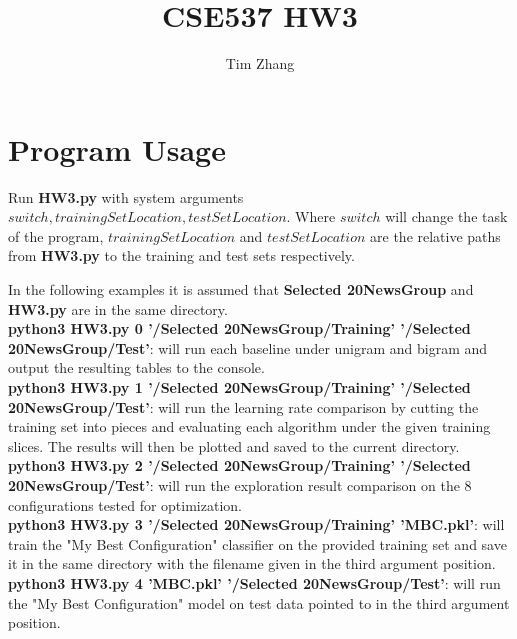 \documentclass[11pt, oneside]{article}   	%
\title{CSE537 HW3}
\author{Tim Zhang}
\begin{document}
\maketitle
\section{Program Usage}
Run \textbf{HW3.py} with system arguments $switch, trainingSetLocation, testSetLocation$.  Where $switch$ will change the task of the program, $trainingSetLocation$ and $testSetLocation$ are the relative paths from \textbf{HW3.py} to the training and test sets respectively.

In the following examples it is assumed that \textbf{Selected 20NewsGroup} and \textbf{HW3.py} are in the same directory.\\

\textbf{python3 HW3.py 0 '/Selected 20NewsGroup/Training' '/Selected 20NewsGroup/Test'}: will run each baseline under unigram and bigram and output the resulting tables to the console.\\

\textbf{python3 HW3.py 1 '/Selected 20NewsGroup/Training' '/Selected 20NewsGroup/Test'}: will run the learning rate comparison by cutting the training set into pieces and evaluating each algorithm under the given training slices.  The results will then be plotted and saved to the current directory.\\

\textbf{python3 HW3.py 2 '/Selected 20NewsGroup/Training' '/Selected 20NewsGroup/Test'}: will run the exploration result comparison on the 8 configurations tested for optimization.\\

\textbf{python3 HW3.py 3 '/Selected 20NewsGroup/Training' 'MBC.pkl'}: will train the "My Best Configuration" classifier on the provided training set and save it in the same directory with the filename given in the third argument position.\\

\textbf{python3 HW3.py 4 'MBC.pkl' '/Selected 20NewsGroup/Test'}: will run the "My Best Configuration" model on test data pointed to in the third argument position.
 
\end{document}
